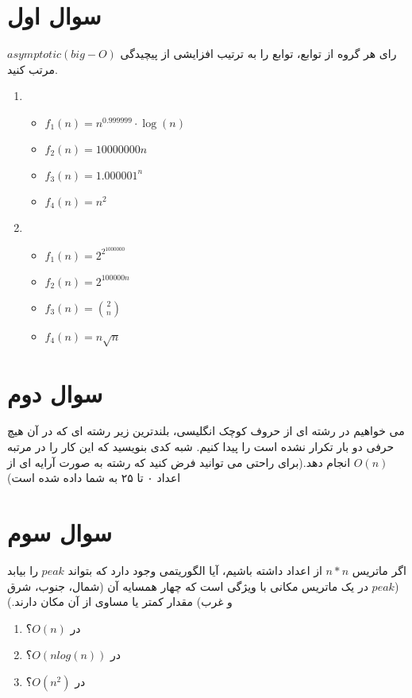 \documentclass[12pt]{article}
\begin{document}
\fontsize{12pt}{14pt}\selectfont



\section{سوال اول}
رای هر گروه از توابع، توابع را به ترتیب افزایشی از پیچیدگی $asymptotic (big-O)$ مرتب کنید.

\begin{enumerate}
  \item \begin{itemize}
          \item $f_1(n) = n^{0.999999} \cdot \log(n)$
          \item $f_2(n) = 10000000n$
          \item $f_3(n) = 1.000001^n$
          \item $f_4(n) = n^2$
        \end{itemize}
        
     \item \begin{itemize}
          \item $f_1(n) = 2^{2^{1000000}}$
          \item $f_2(n) = 2^{100000n}$
          \item $f_3(n) = \binom{2}{n}$
          \item $f_4(n) = n\sqrt{n}$
        \end{itemize}
\end{enumerate}

\section{سوال دوم}
می خواهیم در رشته ای از حروف کوچک انگلیسی، بلندترین زیر رشته ای که در آن هیچ حرفی دو بار تکرار نشده است را پیدا کنیم. شبه کدی بنویسید که این کار را در مرتبه $O(n)$ انجام دهد.(برای راحتی می توانید فرض کنید که رشته به صورت آرایه ای از اعداد ٠ تا ٢۵ به شما داده شده است)


\section{سوال سوم}
اگر ماتریس $n*n$ از اعداد داشته باشیم، آیا الگوریتمی وجود دارد که بتواند $peak$ را بیابد ($peak$ در یک ماتریس مکانی با ویژگی است که چهار همسایه آن (شمال، جنوب، شرق و غرب) مقدار کمتر یا مساوی از آن مکان دارند.)

\begin{enumerate}
  \item در $O(n)$؟
  \item در $O(n log(n))$؟
  \item در $O(n^2)$؟
\end{enumerate}
\end{document}
